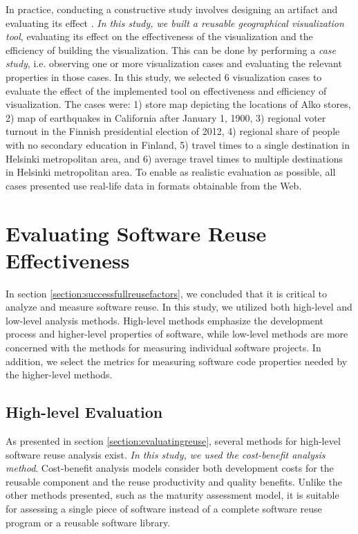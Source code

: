 In practice, conducting a constructive study involves designing an artifact and evaluating its effect \citep{jarvinen_tutkimustyon_2012}. \emph{In this study, we built a reusable geographical visualization tool}, evaluating its effect on the effectiveness of the visualization and the efficiency of building the visualization. This can be done by performing a \emph{case study}, i.e. observing one or more visualization cases and evaluating the relevant properties in those cases. In this study, we selected 6 visualization cases to evaluate the effect of the implemented tool on effectiveness and efficiency of visualization. The cases were: 1) store map depicting the locations of Alko stores, 2) map of earthquakes in California after January 1, 1900, 3) regional voter turnout in the Finnish presidential election of 2012, 4) regional share of people with no secondary education in Finland, 5) travel times to a single destination in Helsinki metropolitan area, and 6) average travel times to multiple destinations in Helsinki metropolitan area. To enable as realistic evaluation as possible, all cases presented use real-life data in formats obtainable from the Web.

\section{Evaluating Software Reuse Effectiveness}

In section \ref{section:successfullreusefactors}, we concluded that it is critical to analyze and measure software reuse. In this study, we utilized both high-level and low-level analysis methods. High-level methods emphasize the development process and higher-level properties of software, while low-level methods are more concerned with the methods for measuring individual software projects. In addition, we select the metrics for measuring software code properties needed by the higher-level methods.

\subsection{High-level Evaluation}
As presented in section \ref{section:evaluatingreuse}, several methods for high-level software reuse analysis exist. \emph{In this study, we used the cost-benefit analysis method}. Cost-benefit analysis models consider both development costs for the reusable component and the reuse productivity and quality benefits. Unlike the other methods presented, such as the maturity assessment model, it is suitable for assessing a single piece of software instead of a complete software reuse program or a reusable software library.

